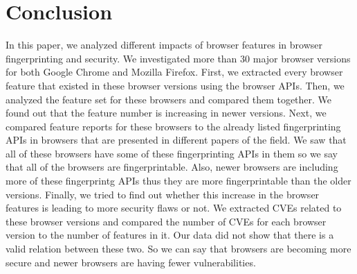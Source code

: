 \section{Conclusion}
\label{sec:conclusion}

In this paper, we analyzed different impacts of browser features in browser fingerprinting and security. We investigated more than 30 major browser versions for both Google Chrome and Mozilla Firefox. First, we extracted every browser feature that existed in these browser versions using the browser APIs. Then, we analyzed the feature set for these browsers and compared them together. We found out that the feature number is increasing in newer versions.
Next, we compared feature reports for these browsers to the already listed fingerprinting APIs in browsers that are presented in different papers of the field. We saw that all of these browsers have some of these fingerprinting APIs in them so we say that all of the browsers are fingerprintable. Also, newer browsers are including more of these fingerprintg APIs thus they are more fingerprintable than the older versions. 
Finally, we tried to find out whether this increase in the browser features is leading to more security flaws or not. We extracted CVEs related to these browser versions and compared the number of CVEs for each browser version to the number of features in it. Our data did not show that there is a valid relation between these two. So we can say that browsers are becoming more secure and newer browsers are having fewer vulnerabilities.